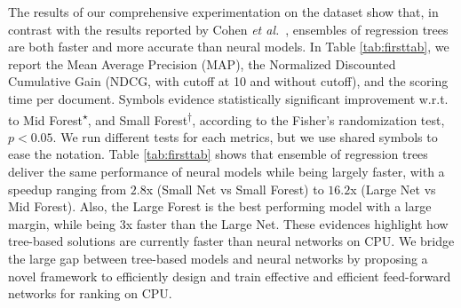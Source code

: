 The results of our comprehensive experimentation on the \msn dataset show that, in contrast with the results reported by Cohen \textit{et al.}~\cite{cohen2018universal}, ensembles of regression trees are both faster and more accurate than neural models. In Table \ref{tab:firsttab}, we report the Mean Average Precision (MAP), the Normalized Discounted Cumulative Gain (NDCG, with cutoff at 10 and without cutoff), and the scoring time per document.
Symbols evidence statistically significant improvement w.r.t. to Mid Forest\textsuperscript{$\star$}, and Small Forest\textsuperscript{$\dag$}, according to the Fisher's randomization test,  $p < 0.05$. We run different tests for each metrics, but we use shared symbols to ease the notation.
Table \ref{tab:firsttab} shows that ensemble of regression trees deliver the same performance of neural models while being largely faster, with a speedup ranging from $2.8$x (Small Net vs Small Forest) to $16.2$x (Large Net vs Mid Forest). Also, the Large Forest is the best performing model with a large margin, while being $3$x faster than the Large Net.
 These evidences highlight how tree-based solutions are currently faster than neural networks on CPU. We bridge the large gap between tree-based models and neural networks by proposing a novel framework to efficiently design and train effective and efficient feed-forward networks for ranking on CPU.

